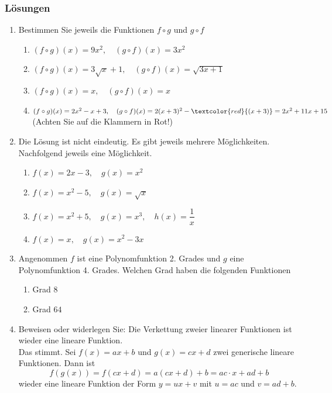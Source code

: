\subsubsection{Lösungen}
\begin{enumerate}
    \item Bestimmen Sie jeweils die Funktionen $f \circ g$ und $g \circ f$
          \begin{enumerate}
              \item $(f \circ g)(x) = 9x^2, \quad (g \circ f)(x) = 3x^2$
              \item $(f \circ g)(x) = 3\sqrt{x} + 1, \quad (g \circ f)(x) = \sqrt{3x+1}$
              \item $(f \circ g)(x) = x, \quad (g \circ f)(x) = x$
              \item $(f \circ g)(x) = 2x^2 - x + 3, \quad (g \circ f)(x) = 2(x+3)^2 - \textcolor{red}{(x+3)} = 2x^2 + 11x + 15$ \\
                    (Achten Sie auf die Klammern in Rot!)
          \end{enumerate}

    \item Die Lösung ist nicht eindeutig. Es gibt jeweils mehrere Möglichkeiten. Nachfolgend jeweils eine Möglichkeit.
          \begin{enumerate}
              \item $f(x) = 2x-3, \quad g(x) = x^2$
              \item $f(x) = x^2 - 5, \quad g(x) = \sqrt{x}$
              \item $f(x) = x^2 + 5, \quad g(x) = x^3, \quad h(x) = \dfrac{1}{x}$
              \item $f(x) = x, \quad g(x) = x^2 - 3x$
          \end{enumerate}

    \item Angenommen $f$ ist eine Polynomfunktion 2. Grades und $g$ eine Polynomfunktion 4. Grades. Welchen Grad haben die folgenden Funktionen
          \begin{enumerate}
              \item Grad $8$
              \item Grad $64$
          \end{enumerate}

    \item Beweisen oder widerlegen Sie: Die Verkettung zweier linearer Funktionen ist wieder eine lineare Funktion. \\
          Das stimmt. Sei $f(x) = ax+b$ und $g(x) = cx+d$ zwei generische lineare Funktionen. Dann ist
          \[
              f(g(x)) = f(cx+d) = a(cx+d)+b = ac \cdot x + ad + b
          \]
          wieder eine lineare Funktion der Form $y = ux+v$ mit $u = ac$ und $v = ad+b$.


\end{enumerate}
